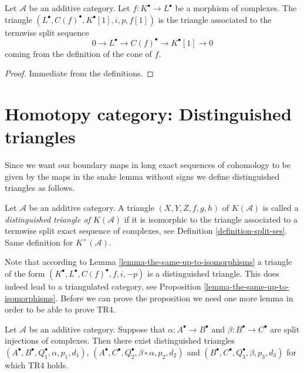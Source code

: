 \begin{lemma}
\label{lemma-rotate-cone}
Let $\mathcal{A}$ be an additive category.
Let $f : K^\bullet \to L^\bullet$ be a morphism of complexes.
The triangle $(L^\bullet, C(f)^\bullet, K^\bullet[1], i, p, f[1])$ is
the triangle associated to the termwise split sequence
$$
0 \to L^\bullet \to C(f)^\bullet \to K^\bullet[1] \to 0
$$
coming from the definition of the cone of $f$.
\end{lemma}

\begin{proof}
Immediate from the definitions.
\end{proof}



\section{Homotopy category: Distinguished triangles}
\label{section-homotopy-triangulated}

\noindent
Since we want our boundary maps in long exact sequences of cohomology
to be given by the maps in the snake lemma without signs we define
distinguished triangles as follows.

\begin{definition}
\label{definition-distinguished-triangle}
Let $\mathcal{A}$ be an additive category.
A triangle $(X, Y, Z, f, g, h)$ of $K(\mathcal{A})$ is
called a {\it distinguished triangle of $K(\mathcal{A})$}
if it is isomorphic to the triangle associated to
a termwise split exact sequence of complexes, see Definition
\ref{definition-split-ses}.
Same definition for $K^{+}(\mathcal{A})$.
\end{definition}

\noindent
Note that according to Lemma \ref{lemma-the-same-up-to-isomorphisms}
a triangle of the form $(K^\bullet, L^\bullet, C(f)^\bullet, f, i, -p)$
is a distinguished triangle.
This does indeed lead to a triangulated category, see
Proposition \ref{lemma-the-same-up-to-isomorphisms}.
Before we can prove the proposition we need one more lemma
in order to be able to prove TR4.

\begin{lemma}
\label{lemma-two-split-injections}
Let $\mathcal{A}$ be an additive category. Suppose that
$\alpha : A^\bullet \to B^\bullet$ and $\beta : B^\bullet \to C^\bullet$
are split injections of complexes. Then there exist distinguished triangles
$(A^\bullet, B^\bullet, Q_1^\bullet, \alpha, p_1, d_1)$,
$(A^\bullet, C^\bullet, Q_2^\bullet, \beta \circ \alpha, p_2, d_2)$
and
$(B^\bullet, C^\bullet, Q_3^\bullet, \beta, p_3, d_3)$
for which TR4 holds.
\end{lemma}

